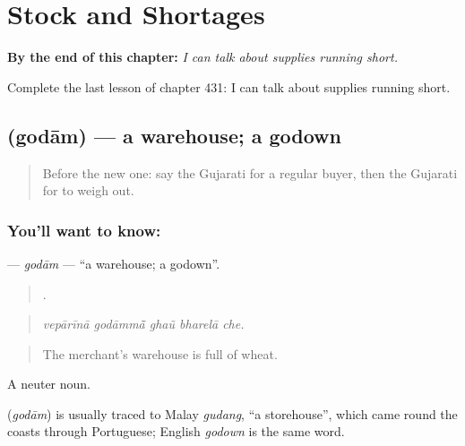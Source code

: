 
\chapter{Stock and Shortages}
\label{ch:gu-stock-and-shortages}

\begin{chapteropening}
\textbf{By the end of this chapter:} \emph{I can talk about supplies running short.}

Complete the last lesson of chapter 431: I can talk about supplies running short.
\end{chapteropening}

\section[\texorpdfstring{\gu{ગોદામ} (godām)}{ગોદામ (godām)}]{ (godām) — a warehouse; a godown}

\label{lesson:GU-C431-godam}



\begin{quote}
Before the new one: say the Gujarati for a regular buyer, then the Gujarati for to weigh out.
\end{quote}

\subsection*{You'll want to know: }
\textbf{} — \emph{godām} — \textquotedblleft{}a warehouse; a godown\textquotedblright{}.

\begin{quote}
    .
\end{quote}

\begin{quote}
\emph{vepārīnā godāmmā̃ ghaũ bharelā che.}
\end{quote}

\begin{quote}
The merchant's warehouse is full of wheat.
\end{quote}

A neuter noun.

\begin{cousinweb}
\textbf{} (\emph{godām}) is usually traced to Malay \emph{gudang}, \textquotedblleft{}a storehouse\textquotedblright{}, which came round the coasts through Portuguese; English \emph{godown} is the same word.
\end{cousinweb}

